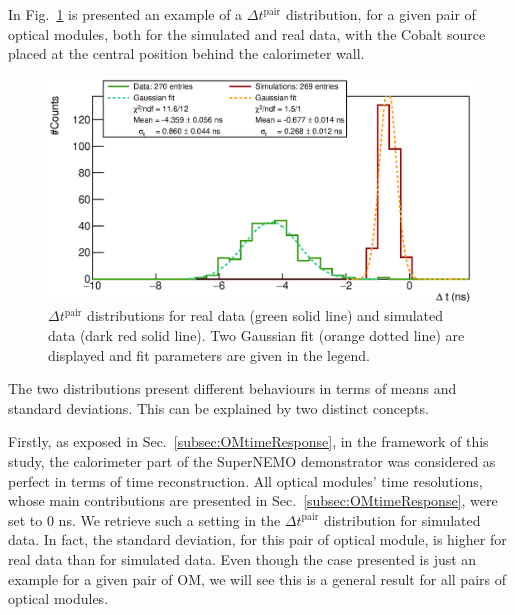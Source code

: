 In Fig.~\ref{fig:Co_deltat} is presented an example of a $\Delta t^{\text{pair}}$ distribution, for a given pair of optical modules, both for the simulated and real data, with the Cobalt source placed at the central position behind the calorimeter wall.
\begin{figure}[h]
  \centering
  \includegraphics[width=15cm]{commissioning/fig_commissioning/Co_deltat_distrib_ex.eps}
  \caption{$\Delta t^{\text{pair}}$ distributions for real data (green solid line) and simulated data (dark red solid line).
    Two Gaussian fit (orange dotted line) are displayed and fit parameters are given in the legend.
    \label{fig:Co_deltat}}
\end{figure}
The two distributions present different behaviours in terms of means and standard deviations.
This can be explained by two distinct concepts.

Firstly, as exposed in Sec.~\ref{subsec:OMtimeResponse}, in the framework of this study, the calorimeter part of the SuperNEMO demonstrator was considered as perfect in terms of time reconstruction.
All optical modules' time resolutions, whose main contributions are presented in Sec.~\ref{subsec:OMtimeResponse}, were set to $0$ ns.
We retrieve such a setting in the $\Delta t^{\text{pair}}$ distribution for simulated data.
In fact, the standard deviation, for this pair of optical module, is higher for real data than for simulated data.
Even though the case presented is just an example for a given pair of OM, we will see this is a general result for all pairs of optical modules.

